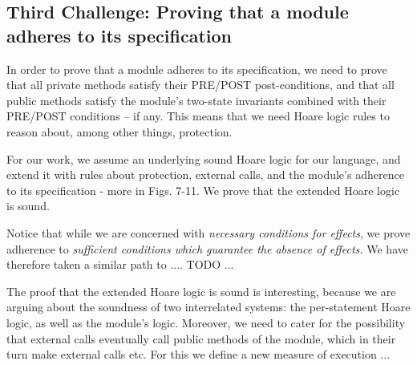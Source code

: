  \subsection{Third Challenge: Proving that a module adheres to its specification}
 \label{sec:howThird}
 
{In order to prove that a module adheres to its specification, we need to prove that all  private methods satisfy their  PRE/POST post-conditions, and that all public methods satisfy the module's two-state invariants combined with their PRE/POST conditions -- if any.
This means that we need Hoare logic rules to reason about, among other things, protection.}

{For our work, we assume an underlying sound Hoare logic for {our} language, and extend it with rules about protection, external calls, and the module's adherence to its 
specification - more in Figs. 7-11.
We prove that the extended Hoare logic is sound.
}

{Notice that while we are concerned with \emph{necessary conditions for effects}, we prove adherence to \emph{sufficient conditions which guarantee the absence of effects.}
We have therefore taken a similar path to .... TODO ...
}

 {The proof that the extended Hoare logic is sound is interesting, because we are arguing about the soundness of two interrelated systems: 
 the per-statement  Hoare logic, as well as the  module's logic.
Moreover, we need to cater for the possibility that external calls eventually call public methods of the module, which in their turn make external calls etc.
For this we define a new measure of execution ...}


 
%

